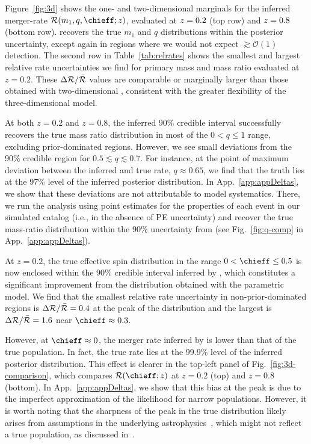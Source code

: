 \begin{refsection}
Figure~\ref{fig:3d} shows the one- and two-dimensional marginals for the inferred merger-rate $\mathcal{R}(m_1, q,\chieff;z)$, evaluated at $z=0.2$ (top row) and $z=0.8$ (bottom row). \PixelPop recovers the true $m_1$ and $q$ distributions within the posterior uncertainty, except again in regions where we would not expect $\gtrsim\mathcal{O}(1)$ detection. The second row in Table~\ref{tab:relrates} shows the smallest and largest relative rate uncertainties we find for primary mass and mass ratio evaluated at $z=0.2$. These $\Delta\mathcal{R}/\bar{\mathcal{R}}$ values are comparable or marginally larger than those obtained with two-dimensional \PixelPop, consistent with the greater flexibility of the three-dimensional model.

At both $z=0.2$ and $z=0.8$, the inferred 90\% credible interval successfully recovers the true mass ratio distribution in most of the $0 < q \leq 1$ range, excluding prior-dominated regions. However, we see small deviations from the 90\% credible region for $0.5 \lesssim q \lesssim 0.7$. For instance, at the point of maximum deviation between the inferred and true rate, $q\approx0.65$, we find that the truth lies at the 97\% level of the inferred posterior distribution. In App.~\ref{app:appDeltas}, we show that these deviations are not attributable to model systematics. There, we run the analysis using point estimates for the properties of each event in our simulated catalog (i.e., in the absence of \ac{PE} uncertainty) and recover the true mass-ratio distribution within the 90\% uncertainty from \PixelPop (see Fig.~\ref{fig:q-comp} in App.~\ref{app:appDeltas}). 

At $z=0.2$, the true effective spin distribution in the range $0 < \chieff \leq 0.5$ is now enclosed within the 90\% credible interval inferred by \PixelPop, which constitutes a significant improvement from the distribution obtained with the parametric \PeakTukey model. We find that the smallest relative rate uncertainty in non-prior-dominated regions is $\Delta\mathcal{R}/\bar{\mathcal{R}}=0.4$ at the peak of the distribution and the largest is $\Delta\mathcal{R}/\bar{\mathcal{R}}=1.6$ near $\chieff\approx0.3$. 
 
However, at $\chieff\approx0$, the merger rate inferred by \PixelPop is lower than that of the true population. In fact, the true rate lies at the 99.9\% level of the inferred posterior distribution. This effect is clearer in the top-left panel of Fig.~\ref{fig:3d-comparison}, which compares $\mathcal{R}(\chieff;z)$ at $z=0.2$ (top) and $z=0.8$ (bottom). In App.~\ref{app:appDeltas}, we show that this bias at the peak is due to the imperfect approximation of the likelihood for narrow populations. However, it is worth noting that the sharpness of the peak in the true distribution likely arises from assumptions in the underlying astrophysics~\citep{Fuller:2019sxi}, which might not reflect a true population, as discussed in~\citet{Colloms:2025hib}.


\end{refsection}
